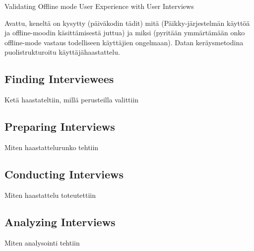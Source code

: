 Validating Offline mode User Experience with User Interviews

Avattu, keneltä on kysytty (päiväkodin tädit) mitä (Päikky-järjestelmän käyttöä ja offline-moodin käsittämisestä juttua) ja miksi (pyritään ymmärtämään onko offline-mode vastaus todelliseen käyttäjien ongelmaan). Datan keräysmetodina puolistrukturoitu käyttäjähaastattelu.

\subsection{Finding Interviewees}
Ketä haastateltiin, millä perusteilla valittiin


\subsection{Preparing Interviews}
Miten haastattelurunko tehtiin


\subsection{Conducting Interviews}
Miten haastattelu toteutettiin


\subsection{Analyzing Interviews}
Miten analysointi tehtiin


  


